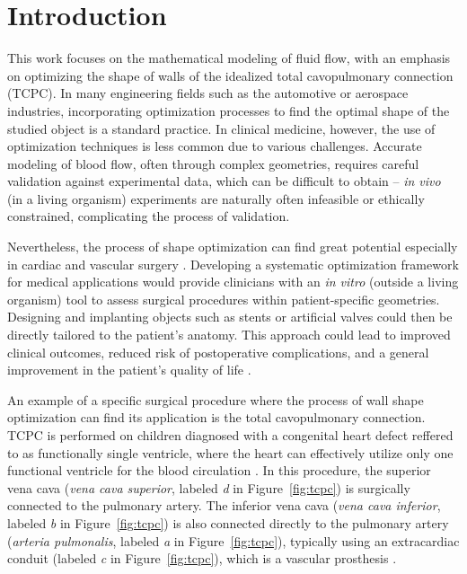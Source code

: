 \chapter*{Introduction}


This work focuses on the mathematical modeling of fluid flow, with an emphasis on optimizing the shape of walls of the idealized total cavopulmonary connection (TCPC). In many engineering fields such as the automotive or aerospace industries, incorporating optimization processes to find the optimal shape of the studied object is a standard practice. In clinical medicine, however, the use of optimization techniques  is less common due to various challenges. Accurate modeling of blood flow, often through complex geometries, requires careful validation against experimental data, which can be difficult to obtain -- \textit{in vivo} (in a living organism) experiments are naturally often infeasible or ethically constrained, complicating the process of validation.

Nevertheless, the process of shape optimization can find great potential especially in cardiac and vascular surgery \cite{Abraham2005, Weddell2015, Marsden2008, Sharma1996, Ensley1999}. Developing a systematic optimization framework for medical applications would provide clinicians with an \textit{in vitro} (outside a living organism) tool to assess surgical procedures within patient-specific geometries. Designing and implanting objects such as stents or artificial valves could then be directly tailored to the patient's anatomy. This approach could lead to improved clinical outcomes, reduced risk of postoperative complications, and a general improvement in the patient's quality of life \cite{Marsden2008, Rijnberg2018}.

An example of a specific surgical procedure where the process of wall shape optimization can find its application is the total cavopulmonary connection. TCPC is performed on children diagnosed with a congenital heart defect reffered to as functionally single ventricle, where  the heart can effectively utilize only one functional ventricle for the blood circulation \cite{Chaloup}. In this procedure, the superior vena cava (\textit{vena cava superior}, labeled \textit{d} in Figure~\ref{fig:tcpc}) is surgically connected to the pulmonary artery. The inferior vena cava (\textit{vena cava inferior}, labeled \textit{b} in Figure~\ref{fig:tcpc}) is also connected directly to the pulmonary artery (\textit{arteria pulmonalis}, labeled \textit{a} in Figure~\ref{fig:tcpc}), typically using an extracardiac conduit (labeled \textit{c} in Figure~\ref{fig:tcpc}), which is a vascular prosthesis \cite{Rubtsova, Delorme}.

